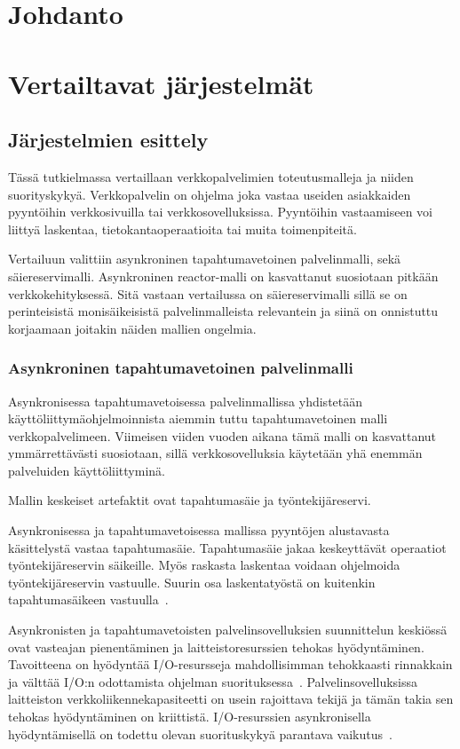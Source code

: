\documentclass[12pt]{article}
\begin{document}
\tableofcontents
\newpage
\section{Johdanto}
\section{Vertailtavat järjestelmät}
\subsection{ Järjestelmien esittely }
Tässä tutkielmassa vertaillaan verkkopalvelimien toteutusmalleja
ja niiden suorityskykyä. Verkkopalvelin on ohjelma joka vastaa useiden asiakkaiden pyyntöihin
verkkosivuilla tai verkkosovelluksissa. Pyyntöihin vastaamiseen
voi liittyä laskentaa, tietokantaoperaatioita tai muita toimenpiteitä.

Vertailuun valittiin asynkroninen tapahtumavetoinen palvelinmalli, sekä säiereservimalli.
Asynkroninen reactor-malli on kasvattanut suosiotaan pitkään verkkokehityksessä. 
Sitä vastaan vertailussa on säiereservimalli sillä se on perinteisistä 
monisäikeisistä palvelinmalleista relevantein ja siinä on onnistuttu korjaamaan
joitakin näiden mallien ongelmia.

\subsubsection{Asynkroninen tapahtumavetoinen palvelinmalli}

Asynkronisessa tapahtumavetoisessa palvelinmallissa yhdistetään
käyttöliittymäohjelmoinnista aiemmin tuttu tapahtumavetoinen malli
verkkopalvelimeen. Viimeisen viiden vuoden aikana tämä malli on
kasvattanut ymmärrettävästi suosiotaan, sillä verkkosovelluksia
käytetään yhä enemmän palveluiden käyttöliittyminä.

Mallin keskeiset artefaktit ovat tapahtumasäie ja työntekijäreservi.

Asynkronisessa ja tapahtumavetoisessa mallissa pyyntöjen alustavasta käsittelystä
vastaa tapahtumasäie.
Tapahtumasäie jakaa keskeyttävät operaatiot
työntekijäreservin säikeille.
Myös raskasta laskentaa voidaan 
ohjelmoida työntekijäreservin vastuulle.
Suurin osa laskentatyöstä
on kuitenkin tapahtumasäikeen vastuulla~\cite{pai_flash:_1999}.

Asynkronisten ja tapahtumavetoisten palvelinsovelluksien suunnittelun keskiössä
ovat vasteajan pienentäminen ja laitteistoresurssien tehokas hyödyntäminen. 
Tavoitteena on hyödyntää I/O-resursseja mahdollisimman tehokkaasti
rinnakkain ja välttää I/O:n odottamista ohjelman suorituksessa~\cite{pai_flash:_1999}.
Palvelinsovelluksissa
laitteiston verkkoliikennekapasiteetti on usein rajoittava tekijä ja tämän takia
sen tehokas hyödyntäminen on kriittistä. I/O-resurssien asynkronisella hyödyntämisellä on todettu
olevan suorituskykyä parantava vaikutus~\cite{hu_applying_1998}.
\end{document}
